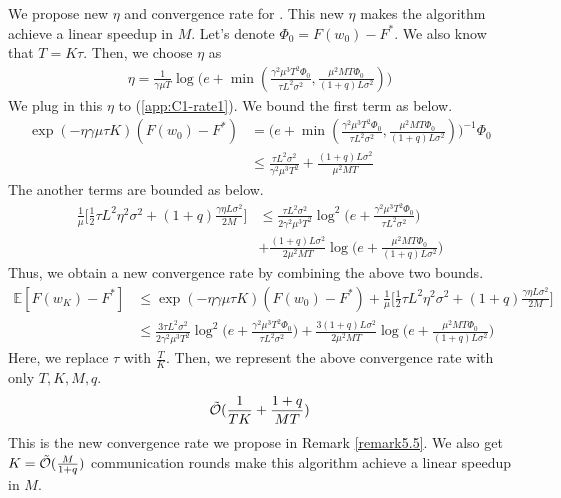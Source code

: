 \documentclass[11pt]{article}
\begin{document}
We propose new $\eta$ and convergence rate for \cite{Yeojoon-haddadpour2021federated}. This new $\eta$ makes the algorithm achieve a linear speedup in $M$. Let's denote $\Phi_0 = F(w_0) - F^*$. We also know that $T = K\tau$. Then, we choose $\eta$ as
\begin{align*}
    \eta = \frac{1}{\gamma\mu T}\log \Big( e+ \min (\frac{\gamma^2\mu^3 T^2 \Phi_0}{\tau L^2\sigma^2}, \frac{\mu^2 MT\Phi_0}{(1+q)L\sigma^2})\Big)
\end{align*}
We plug in this $\eta$ to (\ref{app:C1-rate1}). We bound the first term as below.
\begin{align*}
    \exp(-\eta\gamma\mu\tau K)(F(w_0) - F^*) &= \Big( e+ \min (\frac{\gamma^2\mu^3 T^2 \Phi_0}{\tau L^2\sigma^2}, \frac{\mu^2 MT\Phi_0}{(1+q)L\sigma^2})\Big)^{-1} \Phi_0 \\
    &\leq \frac{\tau L^2\sigma^2}{\gamma^2\mu^3 T^2} + \frac{(1+q)L\sigma^2}{\mu^2 MT}
\end{align*}
The another terms are bounded as below.
\begin{align*}
    \frac{1}{\mu}\Big[\frac{1}{2}\tau L^2\eta^2\sigma^2 + (1+q)\frac{\gamma\eta L\sigma^2}{2M}\Big] &\leq \frac{\tau L^2\sigma^2}{2\gamma^2\mu^3 T^2} \log^2 \Big( e+\frac{\gamma^2\mu^3 T^2\Phi_0}{\tau L^2\sigma^2}\Big) \\
    &+ \frac{(1+q)L\sigma^2}{2\mu^2 MT}\log\Big( e+ \frac{\mu^2 MT\Phi_0}{(1+q)L\sigma^2}\Big)
\end{align*}
Thus, we obtain a new convergence rate by combining the above two bounds.
\begin{align*}
    \mathbb{E}[F(w_K)- F^*] &\leq \exp(-\eta\gamma\mu\tau K)(F(w_0) - F^*) + \frac{1}{\mu}\Big[\frac{1}{2}\tau L^2\eta^2\sigma^2 + (1+q)\frac{\gamma\eta L\sigma^2}{2M}\Big] \\
    &\leq \frac{3\tau L^2\sigma^2}{2\gamma^2\mu^3 T^2} \log^2 \Big( e+\frac{\gamma^2\mu^3 T^2\Phi_0}{\tau L^2\sigma^2}\Big) + \frac{3(1+q)L\sigma^2}{2\mu^2 MT}\log\Big( e+ \frac{\mu^2 MT\Phi_0}{(1+q)L\sigma^2}\Big)
\end{align*}
Here, we replace $\tau$ with $\frac{T}{K}$. Then, we represent the above convergence rate with only $T, K, M, q$.
\begin{gather*}
    \Tilde{\mathcal{O}}(\frac{1}{TK} + \frac{1+q}{MT})
\end{gather*}
This is the new convergence rate we propose in Remark \ref{remark5.5}. We also get $K = \Tilde{\mathcal{O}}(\frac{M}{1+q})$ communication rounds make this algorithm achieve a linear speedup in $M$.
\end{document}

